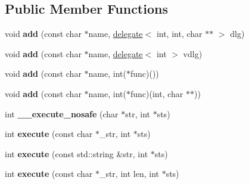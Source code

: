 \subsection*{Public Member Functions}
\begin{DoxyCompactItemize}
\item 
void {\bfseries add} (const char $\ast$name, \hyperlink{classgxx_1_1delegate}{delegate}$<$ int, int, char $\ast$$\ast$ $>$ dlg)\hypertarget{classgxx_1_1sshell_acabb37afdf04fbc38b8622fd31ac5101}{}\label{classgxx_1_1sshell_acabb37afdf04fbc38b8622fd31ac5101}

\item 
void {\bfseries add} (const char $\ast$name, \hyperlink{classgxx_1_1delegate}{delegate}$<$ int $>$ vdlg)\hypertarget{classgxx_1_1sshell_a9483eee6f307c384f5575ca0dd582397}{}\label{classgxx_1_1sshell_a9483eee6f307c384f5575ca0dd582397}

\item 
void {\bfseries add} (const char $\ast$name, int($\ast$func)())\hypertarget{classgxx_1_1sshell_a00a21780fa40100f3fbcc138da647d29}{}\label{classgxx_1_1sshell_a00a21780fa40100f3fbcc138da647d29}

\item 
void {\bfseries add} (const char $\ast$name, int($\ast$func)(int, char $\ast$$\ast$))\hypertarget{classgxx_1_1sshell_a61178f4d89b788f0bc7a2040d2ff5805}{}\label{classgxx_1_1sshell_a61178f4d89b788f0bc7a2040d2ff5805}

\item 
int {\bfseries \+\_\+\+\_\+execute\+\_\+nosafe} (char $\ast$str, int $\ast$sts)\hypertarget{classgxx_1_1sshell_a649d392aed59db9155634833d5033d58}{}\label{classgxx_1_1sshell_a649d392aed59db9155634833d5033d58}

\item 
int {\bfseries execute} (const char $\ast$\+\_\+str, int $\ast$sts)\hypertarget{classgxx_1_1sshell_afffb0d41b4d8c2014afc178106666a51}{}\label{classgxx_1_1sshell_afffb0d41b4d8c2014afc178106666a51}

\item 
int {\bfseries execute} (const std\+::string \&str, int $\ast$sts)\hypertarget{classgxx_1_1sshell_ab050e41202538e2e309aec8f274eafe3}{}\label{classgxx_1_1sshell_ab050e41202538e2e309aec8f274eafe3}

\item 
int {\bfseries execute} (const char $\ast$\+\_\+str, int len, int $\ast$sts)\hypertarget{classgxx_1_1sshell_a2bf47886fc751ce858648703af3f08ad}{}\label{classgxx_1_1sshell_a2bf47886fc751ce858648703af3f08ad}

\end{DoxyCompactItemize}

